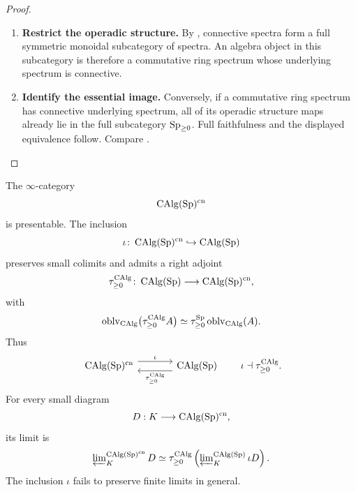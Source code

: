 \begin{proof}
\leavevmode
\begin{enumerate}[label=\textup{(\arabic*)}]
    \item \textbf{Restrict the operadic structure.}
    By , connective spectra
    form a full symmetric monoidal subcategory of spectra. An algebra object
    in this subcategory is therefore a commutative ring spectrum whose
    underlying spectrum is connective.

    \item \textbf{Identify the essential image.}
    Conversely, if a commutative ring spectrum has connective underlying
    spectrum, all of its operadic structure maps already lie in the full
    subcategory \(\operatorname{Sp}_{\geq0}\). Full faithfulness and the displayed
    equivalence follow. Compare \cite{LurieHigherAlgebra,LurieSAG}.
\end{enumerate}
\end{proof}

\begin{proposition}
\label{prop:connective-calg-presentable}
The \(\infty\)-category
\[
    \operatorname{CAlg}(\operatorname{Sp})^{\mathrm{cn}}
\]
is presentable. The inclusion
\[
    \iota
    \colon
    \operatorname{CAlg}(\operatorname{Sp})^{\mathrm{cn}}
    \hookrightarrow
    \operatorname{CAlg}(\operatorname{Sp})
\]
preserves small colimits and admits a right adjoint
\[
    \tau_{\geq0}^{\operatorname{CAlg}}
    \colon
    \operatorname{CAlg}(\operatorname{Sp})
    \longrightarrow
    \operatorname{CAlg}(\operatorname{Sp})^{\mathrm{cn}},
\]
with
\[
    \operatorname{oblv}_{\operatorname{CAlg}}\bigl(\tau_{\geq0}^{\operatorname{CAlg}}A\bigr)
    \simeq
    \tau_{\geq0}^{\operatorname{Sp}}\operatorname{oblv}_{\operatorname{CAlg}}(A).
\]
Thus
\[
\begin{tikzcd}[column sep=large]
    \CAlg(\Sp)^{\mathrm{cn}}
        \arrow[r, shift left=1.1ex, "\iota"]
    &
    \CAlg(\Sp)
        \arrow[l, swap, shift left=1.1ex, "\tau_{\geq0}^{\CAlg}"']
\end{tikzcd}
\qquad
\iota\dashv\tau_{\geq0}^{\CAlg}.
\]
For every small diagram
\[
    D:K\longrightarrow\operatorname{CAlg}(\operatorname{Sp})^{\mathrm{cn}},
\]
its limit is
\[
    \varprojlim\nolimits_K^{\operatorname{CAlg}(\operatorname{Sp})^{\mathrm{cn}}}D
    \simeq
    \tau_{\geq0}^{\operatorname{CAlg}}
    \left(
        \varprojlim\nolimits_K^{\operatorname{CAlg}(\operatorname{Sp})}\iota D
    \right).
\]
The inclusion \(\iota\) fails to preserve finite limits in general.
\end{proposition}

